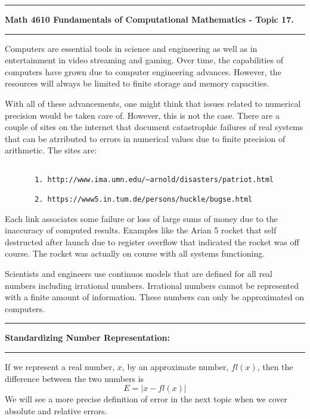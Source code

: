 \documentclass[10pt,fleqn]{article}
\begin{document}
\vskip0.1in\hrule\vskip0.1in \noindent
{\bf Math 4610 Fundamentals of Computational Mathematics  - Topic 17.}
\vskip0.1in\hrule\vskip0.1in \noindent
Computers are essential tools in science and engineering as well as in
entertainment in video streaming and gaming. Over time, the capabilities of
computers have grown due to computer engineering advances. However, the
resources will always be limited to finite storage and memory capacities. 

With all of these advancements, one might think that issues related to numerical
precision would be taken care of. However, this is not the case. There are a
couple of sites on the internet that document catastrophic failures of real
systems that can be atrributed to errors in numerical values due to finite
precision of arithmetic. The sites are:
\begin{verbatim}

       1. http://www.ima.umn.edu/~arnold/disasters/patriot.html

       2. https://www5.in.tum.de/persons/huckle/bugse.html

\end{verbatim}
Each link associates some failure or loss of large sums of money due to the
inaccuracy of computed results. Examples like the Arian 5 rocket that self
destructed after launch due to register overflow that indicated the rocket was
off course. The rocket was actually on course with all systems functioning.

Scientists and engineers use continuos models that are defined for all real
numbers including irrational numbers. Irrational numbers cannot be represented
with a finite amount of information. These numbers can only be approximated on
computers.

\vskip0.1in\hrule\vskip0.1in \noindent
{\bf Standardizing Number Representation:}
\vskip0.1in\hrule\vskip0.1in \noindent
If we represent a real number, \(x\), by an approximate number, \(fl(x)\), then
the difference between the two numbers is
\[
  E = \left\vert
         x - fl(x)
      \right\vert
\]
We will see a more precise definition of error in the next topic when we cover
absolute and relative errors.
\end{document}
